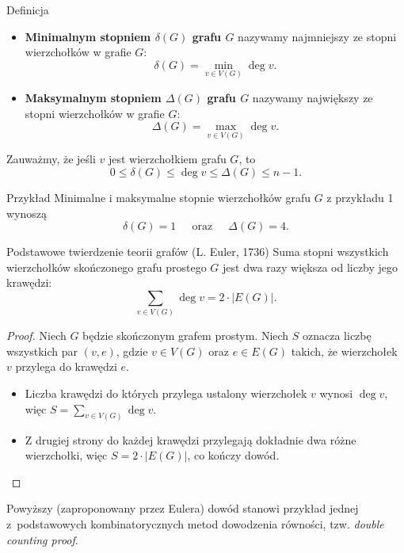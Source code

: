 \documentclass[a4paper,10pt]{beamer}
\begin{document}
\begin{frame}

	
	\begin{block}{Definicja}
	\begin{itemize}
	\item {\bf Minimalnym stopniem $\delta(G)$ grafu $G$} nazywamy najmniejszy ze stopni wierzchołków w grafie $G$:
		$$\delta(G)=\min\limits_{v\in V(G)}\deg v.$$
	\item {\bf Maksymalnym stopniem $\Delta(G)$ grafu $G$} nazywamy największy ze stopni wierzchołków w grafie $G$:
		$$\Delta(G)=\max\limits_{v\in V(G)}\deg v.$$
	\end{itemize}
	\end{block}

Zauważmy, że jeśli $v$ jest wierzchołkiem grafu $G$, to
$$0\leqslant\delta(G)\leqslant\deg v\leqslant \Delta(G)\leqslant n-1.$$

	\begin{exampleblock}{Przykład}
	Minimalne i maksymalne stopnie wierzchołków grafu $G$ z przykładu 1 wynoszą
	$$\delta(G)=1\ \ \ \ \ \mbox{ oraz }\ \ \ \ \ \Delta(G)=4.$$
	\end {exampleblock}
	
\end{frame}




\begin{frame}

\begin{block}{Podstawowe twierdzenie teorii grafów (L. Euler, 1736)}
	Suma stopni wszystkich wierzchołków skończonego grafu prostego $G$ jest dwa razy większa od liczby jego krawędzi:
	$$\sum\limits_{v\in V(G)}\deg v=2\cdot|E(G)|.$$
\end{block}


\begin{proof}
Niech $G$ będzie skończonym grafem prostym. Niech $S$ oznacza liczbę wszystkich par $(v,e)$, gdzie $v\in V(G)$ oraz $e\in E(G)$ takich, że wierzchołek $v$ przylega do krawędzi $e$.
\begin{itemize}
\item Liczba krawędzi do których przylega ustalony wierzchołek $v$ wynosi $\deg v$, więc $ S=\sum_{v\in V(G)}\deg v$.
\item Z drugiej strony do każdej krawędzi przylegają dokładnie dwa różne wierzchołki, więc $S=2\cdot|E(G)|$, co kończy dowód.
\end{itemize}
\end{proof}

\medskip

Powyższy (zaproponowany przez Eulera) dowód stanowi przykład jednej z~podstawowych kombinatorycznych metod dowodzenia równości, tzw. {\it double counting proof}.
\end{frame}
\end{document}
